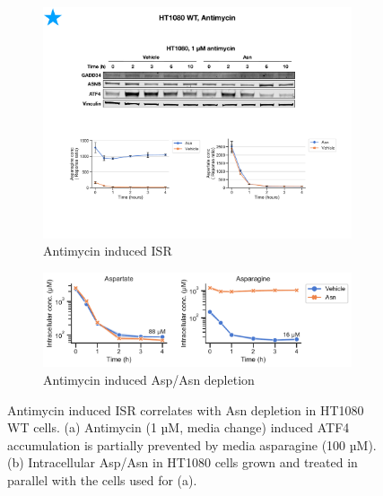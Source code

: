 \begin{figure}[ht]
     \centering
     \begin{subfigure}[b]{0.6\textwidth}
         \includegraphics[width=\textwidth]{figures/chap2/HT1080_Anti_ATF4_western.pdf}
         \caption{Antimycin induced ISR}
         \label{fig:ch2:HT1080_Anti_ATF4_western}
     \end{subfigure}
     \hfill
     \begin{subfigure}[b]{0.85\textwidth}
         \includegraphics[width=\textwidth]{figures/chap2/HT1080_Anti_Asp_Asn.pdf}
         \caption{Antimycin induced Asp/Asn depletion}
         \label{fig:ch2:HT1080_Anti_Asp_Asn}
     \end{subfigure}
     \hfill
        \caption[Antimycin induced ISR correlates with Asn depletion.]{
        Antimycin induced ISR correlates with Asn depletion in HT1080 WT cells.
        (a) Antimycin (1 µM, media change) induced ATF4 accumulation is partially prevented by media asparagine (100 µM).
        (b) Intracellular Asp/Asn in HT1080 cells grown and treated in parallel with the cells used for (a).
        }
        \label{fig:ch2:ISR_resc}
\end{figure}




